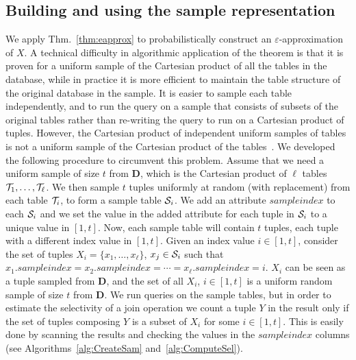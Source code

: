 \subsection{Building and using the sample representation}\label{sec:vcfreqbuilding}
We apply Thm.~\ref{thm:eapprox} to probabilistically construct an $\varepsilon$-approximation of $X$.
A technical difficulty in algorithmic application of the theorem is that it is proven  for
a uniform sample of the Cartesian product
of all the tables in the database, while
in practice it is more efficient to maintain the table structure of the
original database in the sample. It is easier to sample each table
independently, and to run the query on a sample that consists of subsets of the
original tables rather than re-writing the query to run on a Cartesian product
of tuples. However, the Cartesian product of independent uniform samples of
tables is not a uniform sample of the Cartesian product of the
tables~\citep{ChaudhuriMN99}. We developed the following procedure to circumvent
this problem. Assume that we need a uniform sample of size $t$ from
$\mathbf{D}$, which is the Cartesian product of $\ell$ tables
${\cal T}_1,\dotsc,{\cal T}_\ell$. We then sample $t$ tuples uniformly at random (with
replacement) from
each table ${\cal T}_i$, to form a sample table ${\cal S}_i$. We add an attribute
$sampleindex$ to each ${\cal S}_i$ and we set the value in the added attribute for each tuple in
${\cal S}_i$ to a unique value in $[1,t]$. Now, each sample table will contain $t$ tuples,
each tuple with a different index value in $[1,t]$. Given an index value
$i\in[1,t]$, consider the set of tuples $X_i=\{x_1,\dotsc,x_\ell\}$, $x_j\in{\cal S}_i$
such that $x_1.sampleindex = x_2.sampleindex =\dotsb=x_\ell.sampleindex=i$. $X_i$
can be seen as a tuple sampled from $\mathbf{D}$, and the set of all $X_i$,
$i\in[1,t]$ is a uniform random sample of size $t$ from $\mathbf{D}$. We run
queries on the sample tables, but in order to estimate the selectivity of a join
operation we count a tuple $Y$ in the result only if the set of tuples composing
$Y$ is a subset of $X_i$ for some $i\in[1,t]$. This is easily done by scanning
the results and checking the values in the $sampleindex$ columns (see Algorithms~\ref{alg:CreateSam} and~\ref{alg:ComputeSel}).

\begin{algorithm}[ht]
\DontPrintSemicolon
{}
\caption{$\mathtt{CreateSample}(s,(T_1,\dots,T_k))$}\label{alg:CreateSam}
\end{algorithm}

